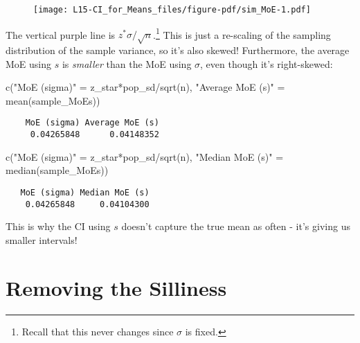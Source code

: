 \documentclass[
  letterpaper,
  DIV=11,
  numbers=noendperiod]{scrreprt}
\newenvironment{Shaded}{\begin{snugshade}}{\end{snugshade}}
\newcommand{\FunctionTok}[1]{\textcolor[rgb]{0.28,0.35,0.67}{#1}}
\newcommand{\NormalTok}[1]{\textcolor[rgb]{0.00,0.23,0.31}{#1}}
\newcommand{\OtherTok}[1]{\textcolor[rgb]{0.00,0.23,0.31}{#1}}
\newcommand{\SpecialCharTok}[1]{\textcolor[rgb]{0.37,0.37,0.37}{#1}}
\newcommand{\StringTok}[1]{\textcolor[rgb]{0.13,0.47,0.30}{#1}}
\begin{document}
\begin{figure}[H]

{\centering \texttt{[image: L15-CI\_for\_Means\_files/figure-pdf/sim\_MoE-1.pdf]}

}

\end{figure}

The vertical purple line is \(z^*\sigma/\sqrt n\).\footnote{Recall that
  this never changes since \(\sigma\) is fixed.} This is just a
re-scaling of the sampling distribution of the sample variance, so it's
also skewed! Furthermore, the average MoE using \(s\) is \emph{smaller}
than the MoE using \(\sigma\), even though it's right-skewed:

\begin{Shaded}
\begin{Highlighting}[]
\FunctionTok{c}\NormalTok{(}\StringTok{"MoE (sigma)"} \OtherTok{=}\NormalTok{ z\_star}\SpecialCharTok{*}\NormalTok{pop\_sd}\SpecialCharTok{/}\FunctionTok{sqrt}\NormalTok{(n),}
    \StringTok{"Average MoE (s)"} \OtherTok{=} \FunctionTok{mean}\NormalTok{(sample\_MoEs))}
\end{Highlighting}
\end{Shaded}

\begin{verbatim}
    MoE (sigma) Average MoE (s) 
     0.04265848      0.04148352 
\end{verbatim}

\begin{Shaded}
\begin{Highlighting}[]
\FunctionTok{c}\NormalTok{(}\StringTok{"MoE (sigma)"} \OtherTok{=}\NormalTok{ z\_star}\SpecialCharTok{*}\NormalTok{pop\_sd}\SpecialCharTok{/}\FunctionTok{sqrt}\NormalTok{(n),}
    \StringTok{"Median MoE (s)"} \OtherTok{=} \FunctionTok{median}\NormalTok{(sample\_MoEs))}
\end{Highlighting}
\end{Shaded}

\begin{verbatim}
   MoE (sigma) Median MoE (s) 
    0.04265848     0.04104300 
\end{verbatim}

This is why the CI using \(s\) doesn't capture the true mean as often -
it's giving us smaller intervals!

\hypertarget{removing-the-silliness}{%
\section{Removing the Silliness}\label{removing-the-silliness}}
\end{document}
